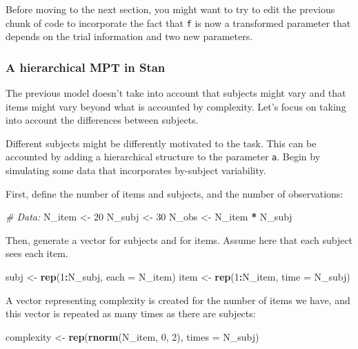 \documentclass[12pt,]{krantz}
\newenvironment{Shaded}{\begin{snugshade}}{\end{snugshade}}
\newcommand{\CommentTok}[1]{\textcolor[rgb]{0.56,0.35,0.01}{\textit{#1}}}
\newcommand{\DataTypeTok}[1]{\textcolor[rgb]{0.13,0.29,0.53}{#1}}
\newcommand{\DecValTok}[1]{\textcolor[rgb]{0.00,0.00,0.81}{#1}}
\newcommand{\KeywordTok}[1]{\textcolor[rgb]{0.13,0.29,0.53}{\textbf{#1}}}
\newcommand{\NormalTok}[1]{#1}
\newcommand{\OperatorTok}[1]{\textcolor[rgb]{0.81,0.36,0.00}{\textbf{#1}}}
\newcommand{\StringTok}[1]{\textcolor[rgb]{0.31,0.60,0.02}{#1}}
\theoremstyle{definition}
\theoremstyle{definition}
\theoremstyle{definition}
\theoremstyle{remark}
\begin{document}
Before moving to the next section, you might want to try to edit the previous chunk of code to incorporate the fact that \texttt{f} is now a transformed parameter that depends on the trial information and two new parameters.

\hypertarget{sec:MPT-h}{%
\subsubsection{A hierarchical MPT in Stan}\label{sec:MPT-h}}

The previous model doesn't take into account that subjects might vary and that items might vary beyond what is accounted by complexity. Let's focus on taking into account the differences between subjects.

Different subjects might be differently motivated to the task. This can be accounted by adding a hierarchical structure to the parameter \texttt{a}. Begin by simulating some data that incorporates by-subject variability.

First, define the number of items and subjects, and the number of observations:

\begin{Shaded}
\begin{Highlighting}[]
\CommentTok{# Data:}
\NormalTok{N_item <-}\StringTok{ }\DecValTok{20}
\NormalTok{N_subj <-}\StringTok{ }\DecValTok{30}
\NormalTok{N_obs <-}\StringTok{ }\NormalTok{N_item }\OperatorTok{*}\StringTok{ }\NormalTok{N_subj }
\end{Highlighting}
\end{Shaded}

Then, generate a vector for subjects and for items. Assume here that each subject sees each item.

\begin{Shaded}
\begin{Highlighting}[]
\NormalTok{subj <-}\StringTok{ }\KeywordTok{rep}\NormalTok{(}\DecValTok{1}\OperatorTok{:}\NormalTok{N_subj, }\DataTypeTok{each =}\NormalTok{ N_item)}
\NormalTok{item <-}\StringTok{ }\KeywordTok{rep}\NormalTok{(}\DecValTok{1}\OperatorTok{:}\NormalTok{N_item, }\DataTypeTok{time =}\NormalTok{ N_subj)}
\end{Highlighting}
\end{Shaded}

A vector representing complexity is created for the number of items we have, and this vector is repeated as many times as there are subjects:

\begin{Shaded}
\begin{Highlighting}[]
\NormalTok{complexity <-}\StringTok{ }\KeywordTok{rep}\NormalTok{(}\KeywordTok{rnorm}\NormalTok{(N_item, }\DecValTok{0}\NormalTok{, }\DecValTok{2}\NormalTok{), }\DataTypeTok{times =}\NormalTok{ N_subj)}
\end{Highlighting}
\end{Shaded}
\end{document}

